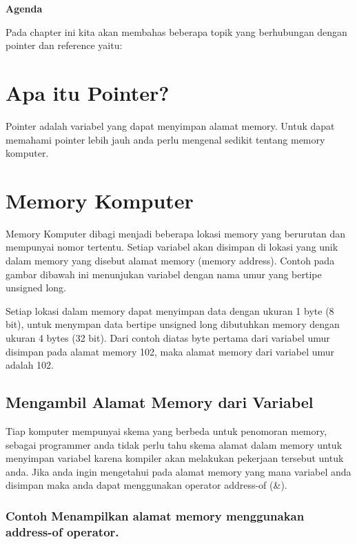 \textbf{Agenda}

Pada chapter ini kita akan membahas beberapa topik yang berhubungan
dengan pointer dan reference yaitu:

\minitoc

\section{Apa itu Pointer?}\label{apa-itu-pointer}

Pointer adalah variabel yang dapat menyimpan alamat memory. Untuk dapat
memahami pointer lebih jauh anda perlu mengenal sedikit tentang memory
komputer.

\section{Memory Komputer}\label{memory-komputer}

Memory Komputer dibagi menjadi beberapa lokasi memory yang berurutan dan
mempunyai nomor tertentu. Setiap variabel akan disimpan di lokasi yang
unik dalam memory yang disebut alamat memory (memory address). Contoh
pada gambar dibawah ini menunjukan variabel dengan nama umur yang
bertipe unsigned long.

Setiap lokasi dalam memory dapat menyimpan data dengan ukuran 1 byte (8
bit), untuk menympan data bertipe unsigned long dibutuhkan memory dengan
ukuran 4 bytes (32 bit). Dari contoh diatas byte pertama dari variabel
umur disimpan pada alamat memory 102, maka alamat memory dari variabel
umur adalah 102.

\subsection{Mengambil Alamat Memory dari
Variabel}\label{mengambil-alamat-memory-dari-variabel}

Tiap komputer mempunyai skema yang berbeda untuk penomoran memory,
sebagai programmer anda tidak perlu tahu skema alamat dalam memory untuk
menyimpan variabel karena kompiler akan melakukan pekerjaan tersebut
untuk anda. Jika anda ingin mengetahui pada alamat memory yang mana
variabel anda disimpan maka anda dapat menggunakan operator address-of
(\&).

\subsubsection*{Contoh  Menampilkan alamat memory menggunakan address-of operator.}

